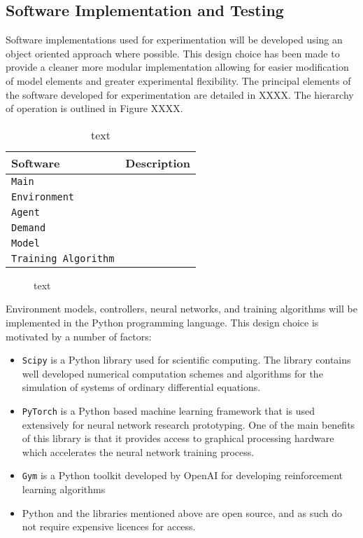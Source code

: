\subsection{Software Implementation and Testing}
Software implementations used for experimentation will be developed using an object oriented approach where possible. This design choice has been made to provide a cleaner more modular implementation allowing for easier modification of model elements and greater experimental flexibility. The principal elements of the software developed for experimentation are detailed in XXXX. The hierarchy of operation is outlined in Figure XXXX.
\begin{table}[h]
	\centering
	\caption{text}
	\begin{tabular}{ll}
		\toprule
		\textbf{Software} & \textbf{Description} \\
		\midrule
		\texttt{Main} & \\
		\texttt{Environment} & \\
		\texttt{Agent} & \\
		\texttt{Demand} & \\
		\texttt{Model} & \\
		\texttt{Training Algorithm} & \\
		\bottomrule
	\end{tabular}
\end{table}

\begin{figure}[h]
	
	\caption{text}
\end{figure}


Environment models, controllers, neural networks, and training algorithms will be implemented in the Python programming language. This design choice is motivated by a number of factors:
\begin{itemize}
	\item \texttt{Scipy} is a Python library used for scientific computing. The library contains well developed numerical computation schemes and algorithms for the simulation of systems of ordinary differential equations.
	\item \texttt{PyTorch} is a Python based machine learning framework that is used extensively for neural network research prototyping. One of the main benefits of this library is that it provides access to graphical processing hardware which accelerates the neural network training process.
	\item \texttt{Gym} is a Python toolkit developed by OpenAI for developing reinforcement learning algorithms
	\item Python and the libraries mentioned above are open source, and as such do not require expensive licences for access.
\end{itemize}

